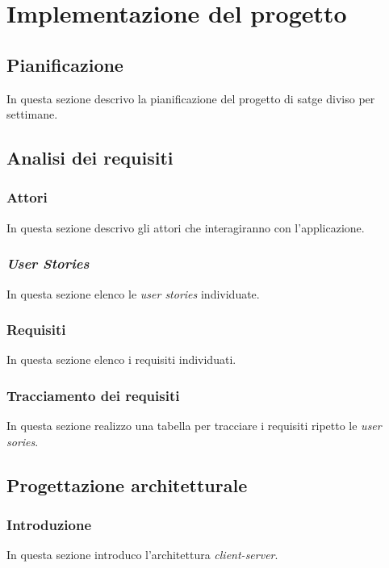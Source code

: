 
\chapter{Implementazione del progetto}
\label{cap:implementazione}
\section{Pianificazione}
In questa sezione descrivo la pianificazione del progetto di satge diviso per settimane.

\section{Analisi dei requisiti}

\subsection{Attori}
In questa sezione descrivo gli attori che interagiranno con l'applicazione.

\subsection{\emph{User Stories}}
In questa sezione elenco le \emph{user stories} individuate.

\subsection{Requisiti}
In questa sezione elenco i requisiti individuati.

\subsection{Tracciamento dei requisiti}
In questa sezione realizzo una tabella per tracciare i requisiti ripetto le \emph{user sories}.

\section{Progettazione architetturale}

\subsection{Introduzione}
In questa sezione introduco l'architettura \emph{client-server}.

